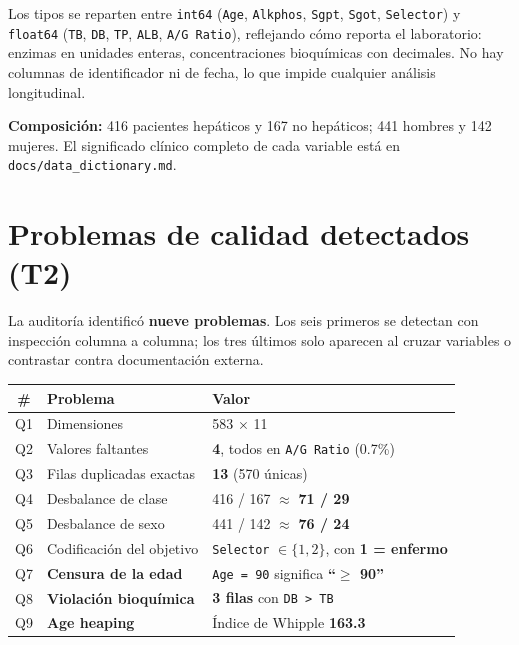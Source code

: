 \documentclass[10pt,a4paper]{article}
\begin{document}
Los tipos se reparten entre \texttt{int64} (\texttt{Age}, \texttt{Alkphos}, \texttt{Sgpt}, \texttt{Sgot}, \texttt{Selector}) y \texttt{float64} (\texttt{TB}, \texttt{DB}, \texttt{TP}, \texttt{ALB}, \texttt{A/G Ratio}), reflejando cómo reporta el laboratorio: enzimas en unidades enteras, concentraciones bioquímicas con decimales. No hay columnas de identificador ni de fecha, lo que impide cualquier análisis longitudinal.

\textbf{Composición:} 416 pacientes hepáticos y 167 no hepáticos; 441 hombres y 142 mujeres. El significado clínico completo de cada variable está en \texttt{docs/data\_dictionary.md}.

\section{Problemas de calidad detectados (T2)}

La auditoría identificó \textbf{nueve problemas}. Los seis primeros se detectan con inspección columna a columna; los tres últimos solo aparecen al cruzar variables o contrastar contra documentación externa.

\begin{table}[H]
\footnotesize
\begin{tabularx}{\textwidth}{@{}c X l@{}}
\toprule
\textbf{\#} & \textbf{Problema} & \textbf{Valor} \\
\midrule
Q1 & Dimensiones & 583 $\times$ 11 \\
Q2 & Valores faltantes & \textbf{4}, todos en \texttt{A/G Ratio} (0.7\%) \\
Q3 & Filas duplicadas exactas & \textbf{13} (570 únicas) \\
Q4 & Desbalance de clase & 416 / 167 $\approx$ \textbf{71 / 29} \\
Q5 & Desbalance de sexo & 441 / 142 $\approx$ \textbf{76 / 24} \\
Q6 & Codificación del objetivo & \texttt{Selector} $\in \{1,2\}$, con \textbf{1 = enfermo} \\
Q7 & \textbf{Censura de la edad} & \texttt{Age = 90} significa \textbf{``$\geq$ 90''} \\
Q8 & \textbf{Violación bioquímica} & \textbf{3 filas} con \texttt{DB > TB} \\
Q9 & \textbf{Age heaping} & Índice de Whipple \textbf{163.3} \\
\bottomrule
\end{tabularx}
\end{table}
\end{document}
